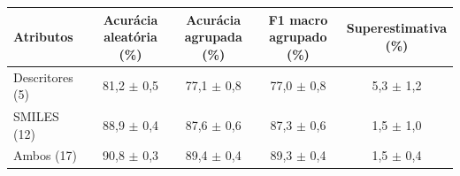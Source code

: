 \begin{tabular}{lcccc}
\toprule
Atributos & \shortstack{Acurácia\\aleatória (\%)} & \shortstack{Acurácia\\agrupada (\%)} & \shortstack{F1 macro\\agrupado (\%)} & \shortstack{Superestimativa\\(\%)} \\
\midrule
Descritores (5) & 81,2 $\pm$ 0,5 & 77,1 $\pm$ 0,8 & 77,0 $\pm$ 0,8 & 5,3 $\pm$ 1,2 \\
SMILES (12) & 88,9 $\pm$ 0,4 & 87,6 $\pm$ 0,6 & 87,3 $\pm$ 0,6 & 1,5 $\pm$ 1,0 \\
Ambos (17) & 90,8 $\pm$ 0,3 & 89,4 $\pm$ 0,4 & 89,3 $\pm$ 0,4 & 1,5 $\pm$ 0,4 \\
\bottomrule
\end{tabular}
